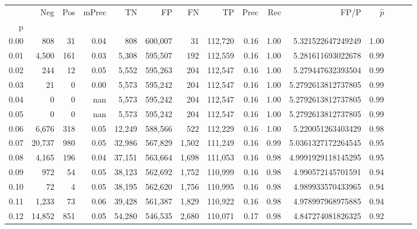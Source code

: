 \begin{tabular}{rrrrrrrrrrrrrrr}
\toprule
{} &     Neg &     Pos & mPrec &       TN &       FP &       FN &       TP &  Prec &   Rec &                    FP/P & $\hat{p}$ \\
p    &         &         &       &          &          &          &          &       &       &                         &           \\
\midrule
0.00 &     808 &      31 &  0.04 &      808 &  600,007 &       31 &  112,720 &  0.16 &  1.00 &       5.321522647249249 &      1.00 \\
0.01 &   4,500 &     161 &  0.03 &    5,308 &  595,507 &      192 &  112,559 &  0.16 &  1.00 &       5.281611693022678 &      0.99 \\
0.02 &     244 &      12 &  0.05 &    5,552 &  595,263 &      204 &  112,547 &  0.16 &  1.00 &       5.279447632393504 &      0.99 \\
0.03 &      21 &       0 &  0.00 &    5,573 &  595,242 &      204 &  112,547 &  0.16 &  1.00 &      5.2792613812737805 &      0.99 \\
0.04 &       0 &       0 &   nan &    5,573 &  595,242 &      204 &  112,547 &  0.16 &  1.00 &      5.2792613812737805 &      0.99 \\
0.05 &       0 &       0 &   nan &    5,573 &  595,242 &      204 &  112,547 &  0.16 &  1.00 &      5.2792613812737805 &      0.99 \\
0.06 &   6,676 &     318 &  0.05 &   12,249 &  588,566 &      522 &  112,229 &  0.16 &  1.00 &       5.220051263403429 &      0.98 \\
0.07 &  20,737 &     980 &  0.05 &   32,986 &  567,829 &    1,502 &  111,249 &  0.16 &  0.99 &      5.0361327172264545 &      0.95 \\
0.08 &   4,165 &     196 &  0.04 &   37,151 &  563,664 &    1,698 &  111,053 &  0.16 &  0.98 &      4.9991929118145295 &      0.95 \\
0.09 &     972 &      54 &  0.05 &   38,123 &  562,692 &    1,752 &  110,999 &  0.16 &  0.98 &       4.990572145701591 &      0.94 \\
0.10 &      72 &       4 &  0.05 &   38,195 &  562,620 &    1,756 &  110,995 &  0.16 &  0.98 &       4.989933570433965 &      0.94 \\
0.11 &   1,233 &      73 &  0.06 &   39,428 &  561,387 &    1,829 &  110,922 &  0.16 &  0.98 &       4.978997968975885 &      0.94 \\
0.12 &  14,852 &     851 &  0.05 &   54,280 &  546,535 &    2,680 &  110,071 &  0.17 &  0.98 &       4.847274081826325 &      0.92 \\

\end{tabular}
